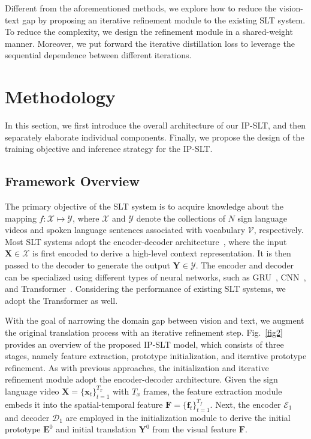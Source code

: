 \documentclass[10pt,twocolumn,letterpaper]{article}
\begin{document}
Different from the aforementioned methods, we explore how to reduce the vision-text gap by proposing an iterative refinement module to the existing SLT system. To reduce the complexity, we design the refinement module in a shared-weight manner.
Moreover, we put forward the iterative distillation loss to leverage the sequential dependence between different iterations.

\section{Methodology}

In this section, we first introduce the overall architecture of our IP-SLT, and then separately elaborate individual components. Finally, we propose the design of the training objective and inference strategy for the IP-SLT.

    \subsection{Framework Overview}
    The primary objective of the SLT system is to acquire knowledge about the mapping $f: \mathcal{X} \mapsto \mathcal{Y}$, where $\mathcal{X}$ and $\mathcal{Y}$ denote the collections of $N$ sign language videos and spoken language sentences associated with vocabulary $\mathcal{V}$, respectively. Most SLT systems adopt the encoder-decoder architecture~\cite{sutskever2014sequence}, where the input $\bm{X} \in \mathcal{X}$ is first encoded to derive a high-level context representation. It is then passed to the decoder to generate the output $\bm{Y} \in \mathcal{Y}$. The encoder and decoder can be specialized using different types of neural networks, such as GRU~\cite{bahdanau2014neural}, CNN~\cite{gehring2017convolutional}, and Transformer~\cite{vaswani2017attention}. 
    Considering the performance of existing SLT systems, we adopt the Transformer as well.
    
    With the goal of narrowing the domain gap between vision and text, we augment the original translation process with an iterative refinement step. Fig.~\ref{fig2} provides an overview of the proposed IP-SLT model, which consists of three stages, namely feature extraction, prototype initialization, and iterative prototype refinement. As with previous approaches, the initialization and iterative refinement module adopt the encoder-decoder architecture. Given the sign language video $\bm{X}=\{\bm{x}_t\}_{t=1}^{T_x}$ with $T_x$ frames, the feature extraction module embeds it into the spatial-temporal feature $\bm{F}=\{\bm{f}_t\}_{t=1}^{T_f}$. Next, the encoder $\mathcal{E}_1$ and decoder $\mathcal{D}_1$ are employed in the initialization module to derive the initial prototype $\bm{E}^0$ and initial translation $\bm{Y}^0$ from the visual feature $\bm{F}$. 
    
\end{document}
